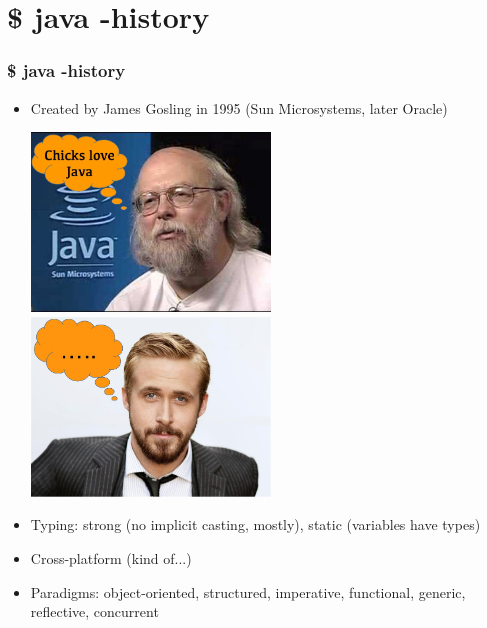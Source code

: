 
\section{\$ java -history}



\begin{frame}
  \frametitle{\$ java -history}
  \begin{itemize}
    \item Created by James Gosling in 1995 (Sun Microsystems, later Oracle)
    \begin{center}
      \includegraphics[width=0.5\textwidth]{fig/old}
      \includegraphics[width=0.5\textwidth]{fig/young}
    \end{center}

    \item Typing: strong (no implicit casting, mostly), static (variables have types)
    \item Cross-platform (kind of...)
    \item Paradigms: object-oriented, structured, imperative, functional, generic, reflective, concurrent
  \end{itemize}
\end{frame}



